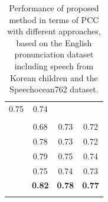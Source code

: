 \documentclass[a4paper]{article}
\begin{document}
\begin{table} [ht]
\begin{tabular}{c|c|c|c}
	\multicolumn{1}{|c}{0.75}&
	\multicolumn{1}{|c}{0.74}\\

    \Xhline{3\arrayrulewidth}
	\multicolumn{1}{l}{Finetuned} &
	\multicolumn{1}{|c}{}&
	\multicolumn{1}{|c}{}&
	\multicolumn{1}{|c}{}\\
	
	\multicolumn{1}{l}{\quad \text{wav2vec2 Base}} &
	\multicolumn{1}{|c}{0.68}&
	\multicolumn{1}{|c}{0.73}&
	\multicolumn{1}{|c}{0.72}\\

	\multicolumn{1}{l}{\quad \text{wav2vec2 Large}} &
	\multicolumn{1}{|c}{0.78}&
	\multicolumn{1}{|c}{0.73}&
	\multicolumn{1}{|c}{0.72}\\

	\multicolumn{1}{l}{\quad \text{wav2vec2 Robust}} &
	\multicolumn{1}{|c}{0.79}&
	\multicolumn{1}{|c}{0.75}&
	\multicolumn{1}{|c}{0.74}\\

	\multicolumn{1}{l}{\quad \text{HuBERT Base}} &
	\multicolumn{1}{|c}{0.75}&
	\multicolumn{1}{|c}{0.74}&
	\multicolumn{1}{|c}{0.73}\\

	\multicolumn{1}{l}{\quad \text{HuBERT Large}} &
	\multicolumn{1}{|c}{\textbf{0.82}}&
	\multicolumn{1}{|c}{\textbf{0.78}}&
	\multicolumn{1}{|c}{\textbf{0.77}}\\

    
    \Xhline{5\arrayrulewidth}
\end{tabular}
\caption{Performance of proposed method in terms of PCC with different approaches, based on the English pronunciation dataset including speech from Korean children and the Speechocean762 dataset.}

\label{tab:1}
\end{table}
\end{document}
